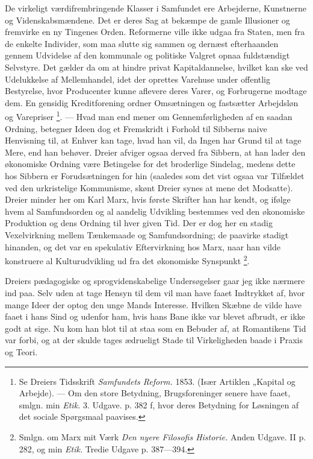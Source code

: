 \documentclass[12pt,a4paper,openany]{book}
\newcommand{\opage}[1]{\marginnote{\footnotesize\textit{[#1]}}}
\begin{document}
\setcounter{footnote}{0}%
\opage{182}De virkeligt værdifrembringende Klasser i Samfundet ere Arbejderne,
Kunstnerne og Videnskabsmændene. Det er deres Sag at bekæmpe de gamle
Illusioner og fremvirke en ny Tingenes Orden. Reformerne ville ikke udgaa fra
Staten, men fra de enkelte Individer, som maa slutte sig sammen og dernæst
efterhaanden gennem Udvidelse af den kommunale og politiske Valgret opnaa
fuldstændigt Selvstyre. Det gælder da om at hindre privat Kapitaldannelse,
hvilket kan ske ved Udelukkelse af Mellemhandel, idet der oprettes Varehuse
under offentlig Bestyrelse, hvor Producenter kunne aflevere deres Varer, og
Forbrugerne modtage dem. En gensidig Kreditforening ordner Omsætningen og
fastsætter Arbejdsløn og Varepriser%
\footnote[1]{Se Dreiers Tidsskrift \textit{Samfundets Reform.} 1853. (Især
Artiklen „Kapital og Arbejde). --- Om den store Betydning, Brugsforeninger
senere have faaet, smlgn. min \textit{Etik.} 3. Udgave. p. 382 f, hvor deres
Betydning for Løsningen af det sociale Spørgsmaal paavises.}. --- Hvad man end
mener om Gennemførligheden af en saadan Ordning, betegner Ideen dog et
Fremskridt i Forhold til Sibberns naive Henvisning til, at Enhver kan tage,
hvad han vil, da Ingen har Grund til at tage Mere, end han behøver. Dreier
afviger ogsaa derved fra Sibbern, at han lader den økonomiske Ordning være
Betingelse for det broderlige Sindelag, medens dette hos Sibbern er
Forudsætningen for hin (saaledes som det vist ogsaa var Tilfældet ved den
urkristelige Kommunisme, skønt Dreier synes at mene det Modsatte). Dreier
minder her om Karl Marx, hvis første Skrifter han har kendt, og ifølge hvem al
Samfundsorden og al aandelig Udvikling bestemmes ved den økonomiske Produktion
og dens Ordning til hver given Tid. Der er dog her en stadig Vexelvirkning
mellem Tænkemaade og Samfundsordning; de paavirke stadigt hinanden, og det var
en spekulativ Eftervirkning hos Marx, naar han vilde konstruere al
Kulturudvikling ud fra det økonomiske Synspunkt%
\footnote[2]{Smlgn. om Marx mit Værk \textit{Den nyere Filosofis Historie.}
Anden Udgave. II p. 282, og min \textit{Etik.} Tredie Udgave p. 387---394.}.

Dreiers pædagogiske og sprogvidenskabelige Undersøgelser gaar jeg ikke nærmere
ind paa. Selv uden at tage Hensyn
\setcounter{footnote}{0}%
\opage{183}til dem vil man have faaet Indtrykket af, hvor mange Ideer der optog
den unge Mands Interesse. Hvilken Skæbne de vilde have faaet i hans Sind og
udenfor ham, hvis hans Bane ikke var blevet afbrudt, er ikke godt at sige. Nu
kom han blot til at staa som en Bebuder af, at Romantikens Tid var forbi, og at
der skulde tages ædrueligt Stade til Virkeligheden baade i Praxis og Teori.
\end{document}

